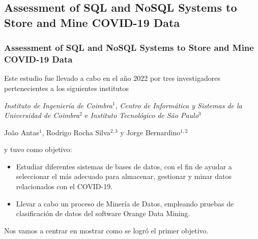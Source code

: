 \subsection{Assessment of SQL and NoSQL Systems to Store and
Mine COVID-19 Data}

\begin{frame}
    \frametitle{Assessment of SQL and NoSQL Systems to Store and Mine COVID-19 Data}

    Este estudio fue llevado a cabo en el año 2022 por tres investigadores pertenecientes a los siguientes institutos

    \vspace{-0.3cm}
    
    \begin{center}
        \textit{Instituto de Ingeniería de Coimbra}$^1$, \textit{Centro de Informática y Sistemas de la Universidad de Coimbra}$^2$ e \textit{Instituto Tecnológico de São Paulo}$^3$
    \end{center}

    \vspace{-0.4cm}
    
    \begin{center}
        João Antas$^1$, Rodrigo Rocha Silva$^{2,3}$ y Jorge Bernardino$^{1,2}$
    \end{center}

    \vspace{-0.1cm}
    
    y tuvo como objetivo:

     

    \begin{itemize}
        \item Estudiar diferentes sistemas de bases de datos, con el fin de ayudar a seleccionar el más adecuado para almacenar, gestionar y minar datos relacionados con el COVID-19.

         
        
        \item Llevar a cabo un proceso de Minería de Datos, empleando pruebas de clasificación de datos del software Orange Data Mining.
    \end{itemize}

     

    Nos vamos a centrar en mostrar como se logró el primer objetivo.
\end{frame}

